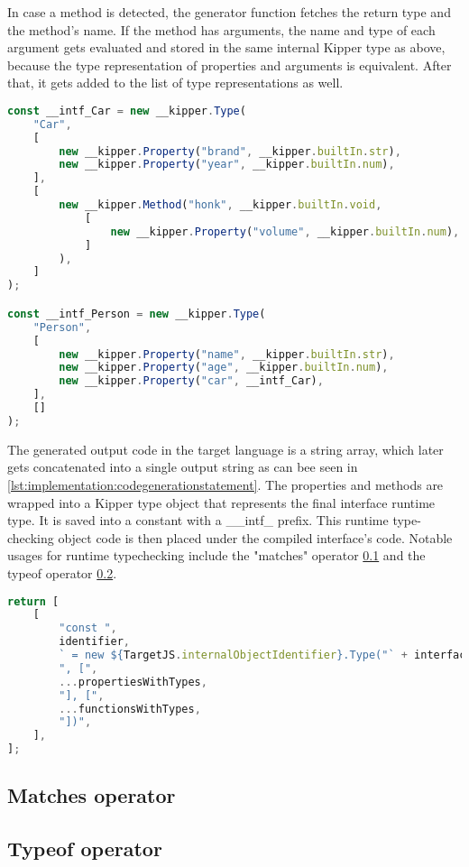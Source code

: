  In case a method is detected, the generator function fetches the return type and the method's name. If the method has arguments, the name and type of each argument gets evaluated and stored in the same internal Kipper type as above, because the type representation of properties and arguments is equivalent. After that, it gets added to the list of type representations as well.

\begin{lstlisting}[language=Typescript,caption=The runtime representation of the previous interfaces,label=lst:implementation:runtimeinterface]
const __intf_Car = new __kipper.Type(
	"Car",
	[
		new __kipper.Property("brand", __kipper.builtIn.str),
		new __kipper.Property("year", __kipper.builtIn.num),
	],
	[
		new __kipper.Method("honk", __kipper.builtIn.void, 
			[
				new __kipper.Property("volume", __kipper.builtIn.num),
			]
		),
	]
);

const __intf_Person = new __kipper.Type(
	"Person",
	[
		new __kipper.Property("name", __kipper.builtIn.str),
		new __kipper.Property("age", __kipper.builtIn.num),
		new __kipper.Property("car", __intf_Car),
	],
	[]
);
\end{lstlisting}

The generated output code in the target language is a string array, which later gets concatenated into a single output string as can bee seen in \ref{lst:implementation:codegenerationstatement}. The properties and methods are wrapped into a Kipper type object that represents the final interface runtime type. It is saved into a constant with a \_\_intf\_ prefix. This runtime type-checking object code is then placed under the compiled interface's code. Notable usages for runtime typechecking include the "matches" operator \ref{subsec:matches} and the typeof operator \ref{subsec:typeof}.

\begin{lstlisting}[language=Typescript,caption=Code generation statement ,label=lst:implementation:codegenerationstatement]
return [
	[
		"const ",
		identifier,
		` = new ${TargetJS.internalObjectIdentifier}.Type("` + interfaceName + '"',
		", [",
		...propertiesWithTypes,
		"], [",
		...functionsWithTypes,
		"])",
	],
];
\end{lstlisting}



\subsection{Matches operator}
\label{subsec:matches}

\subsection{Typeof operator}
\label{subsec:typeof}